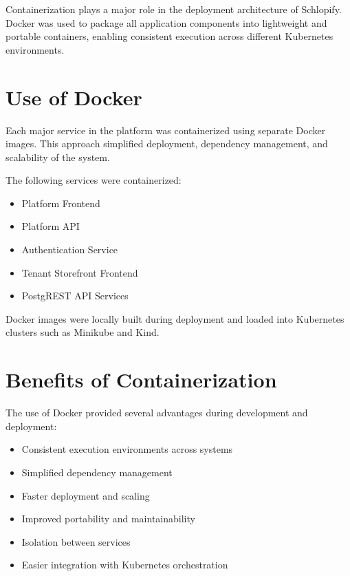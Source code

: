 \documentclass[12pt,a4paper]{report}
\begin{document}
Containerization plays a major role in the deployment architecture of Schlopify. Docker was used to package all application components into lightweight and portable containers, enabling consistent execution across different Kubernetes environments.

\section{Use of Docker}

Each major service in the platform was containerized using separate Docker images. This approach simplified deployment, dependency management, and scalability of the system.

The following services were containerized:

\begin{itemize}

    \item Platform Frontend
    \item Platform API
    \item Authentication Service
    \item Tenant Storefront Frontend
    \item PostgREST API Services

\end{itemize}

Docker images were locally built during deployment and loaded into Kubernetes clusters such as Minikube and Kind.

\section{Benefits of Containerization}

The use of Docker provided several advantages during development and deployment:

\begin{itemize}

    \item Consistent execution environments across systems
    \item Simplified dependency management
    \item Faster deployment and scaling
    \item Improved portability and maintainability
    \item Isolation between services
    \item Easier integration with Kubernetes orchestration

\end{itemize}
\end{document}
